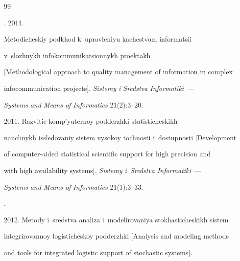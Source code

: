 {\small\frenchspacing


{%




\begin{thebibliography}{99}




. 2011.


Metodicheskiy podkhod k~upravleniyu kachestvom informatsii


v~slozhnykh infokommunikatsionnykh proektakh


[Methodological approach to quality management of information in complex


infocommunication projects]. \textit{Sistemy i Sredstva Informatiki}~---


\textit{Systems and Means of Informatics}  21(2):3--20.







 2011. Razvitie komp'yuternoy podderzhki statisticheskikh


nauchnykh issledovaniy sistem vysokoy tochnosti i~dostupnosti [Development


of computer-aided statistical scientific support for high precision and


with high availability systems]. \textit{Sistemy i~Sredstva Informatiki}~---


\textit{Systems and Means of Informatics}  21(1):3--33.







.


2012. Metody i~sredstva analiza i~modelirovaniya stokhasticheskikh sistem


integrirovannoy logisticheskoy podderzhki [Analysis and modeling methods


and tools for integrated logistic support of stochastic systems].



\end{thebibliography}}}
